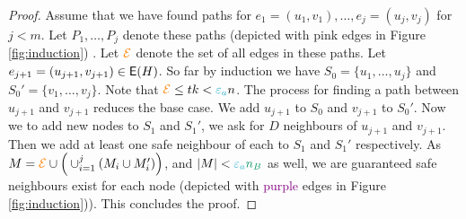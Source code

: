 \documentclass[11pt]{article}
\begin{document}
\begin{proof}
Assume that we have found paths for $e_1 = (u_1, v_1), \dots, e_j=(u_j, v_j)$ for $j < m$.
Let $P_1, \dots, P_j$ denote these paths (depicted with \textcolor{carminepink}{pink} edges in Figure \ref{fig:induction}) .
Let $\textcolor{orange}{\mathcal{E}}$ denote the set of all edges in these paths.
Let $e_{j+1} = (u_{j+1},v_{j+1}) \in \mathsf{E}(H)$.
So far by induction we have $S_0 = \{u_1, \dots, u_j\}$ and $S_0' = \{v_1, \dots, v_j\}$.
Note that $\GlobalEdgeSet \leq tk < \epsilonA n$.
The process for finding a path between $u_{j+1}$ and $v_{j+1}$ reduces the base case.
We add $u_{j+1}$ to $S_0$ and $v_{j+1}$ to $S_0'$.
Now we to add new nodes to $S_{1}$ and $S_{1}'$, we ask for $D$ neighbours of $u_{j+1}$ and $v_{j+1}$.
Then we add at least one safe neighbour of each to $S_1$ and $S_1'$ respectively. As $M = \textcolor{orange}{\mathcal{E}} \cup \Big(\cup_{i=1}^{j} (M_i \cup M'_i)\Big)$, and $|M| < \epsilonA\na$ as well, we are guaranteed safe neighbours exist for each node (depicted with \textcolor{purple}{purple} edges in Figure \ref{fig:induction})).
This concludes the proof.


\end{proof}
\end{document}

